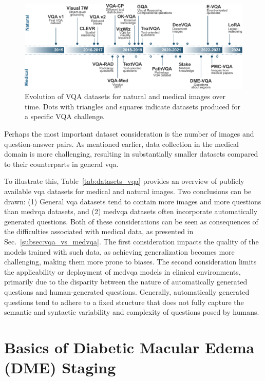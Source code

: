\begin{figure}[t]
\begin{center}
\includegraphics[width=\textwidth]{Figures/Background/vqa_datasets_evolution.pdf}
\caption{Evolution of VQA datasets for natural and medical images over time. Dots with triangles and squares indicate datasets produced for a specific VQA challenge.}
\label{fig:vqa_datasets_evolution}
\end{center}
\end{figure}

Perhaps the most important dataset consideration is the number of images and question-answer pairs. As mentioned earlier, data collection in the medical domain is more challenging, resulting in substantially smaller datasets compared to their counterparts in general \gls{vqa}. 

To illustrate this, Table~\ref{tab:datasets_vqa} provides an overview of publicly available \gls{vqa} datasets for medical and natural images. Two conclusions can be drawn: (1) General \gls{vqa} datasets tend to contain more images and more questions than \gls{medvqa} datasets, and (2) \gls{medvqa} datasets often incorporate automatically generated questions. Both of these considerations can be seen as consequences of the difficulties associated with medical data, as presented in Sec.~\ref{subsec:vqa_vs_medvqa}. The first consideration impacts the quality of the models trained with such data, as achieving generalization becomes more challenging, making them more prone to biases. The second consideration limits the applicability or deployment of \gls{medvqa} models in clinical environments, primarily due to the disparity between the nature of automatically generated questions and human-generated questions. Generally, automatically generated questions tend to adhere to a fixed structure that does not fully capture the semantic and syntactic variability and complexity of questions posed by humans. 




\section{Basics of Diabetic Macular Edema (DME) Staging}

